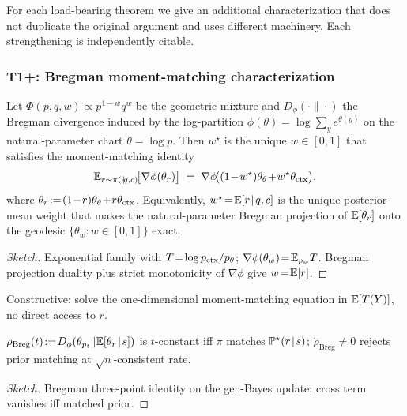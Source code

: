 For each load-bearing theorem we give an additional characterization
that does not duplicate the original argument and uses different
machinery.  Each strengthening is independently citable.

\subsubsection{T1+: Bregman moment-matching characterization}
\label{app:t1-bregman}

\begin{theorem}
\label{thm:t1-bregman}
Let $\Phi(p,q,w)\!\propto\!p^{1-w}q^{w}$ be the geometric mixture and
$D_\phi(\cdot\|\cdot)$ the Bregman divergence induced by the
log-partition $\phi(\theta)\!=\!\log\sum_y e^{\theta(y)}$ on the
natural-parameter chart $\theta\!=\!\log p$.  Then $w^\star$ is
the unique $w\!\in\![0,1]$ that satisfies the moment-matching
identity
\[
\E_{r\sim\pi(\cdot\!\mid\! q,c)}\!\bigl[\nabla\phi(\theta_r)\bigr]
\;=\;\nabla\phi\!\bigl((1\!-\!w^\star)\theta_\theta\!+\!w^\star\theta_\ctx\bigr),
\]
where $\theta_r\!:=\!(1\!-\!r)\theta_\theta\!+\!r\theta_{\mathrm{ctx}}$.
Equivalently, $w^\star\!=\!\mathbb{E}[r\!\mid\! q,c]$ is the unique
posterior-mean weight that makes the natural-parameter Bregman
projection of $\mathbb{E}[\theta_r]$ onto the geodesic
$\{\theta_w\!:\!w\!\in\![0,1]\}$ exact.
\end{theorem}

\begin{proof}[Sketch]
Exponential family with $T\!=\!\log p_{\mathrm{ctx}}/p_\theta$;
$\nabla\phi(\theta_w)\!=\!\mathbb{E}_{p_w}T$.  Bregman projection duality
plus strict monotonicity of $\nabla\phi$ give $w\!=\!\mathbb{E}[r]$.
\end{proof}

Constructive: solve the one-dimensional moment-matching equation
in $\mathbb{E}[T(Y)]$, no direct access to $r$.

\begin{corollary}
\label{cor:bregman-conserved}
$\rho_{\mathrm{Breg}}(t)\!:=\!D_\phi(\theta_{p_t}\|\mathbb{E}[\theta_r\!\mid\!s])$
is $t$-constant iff $\pi$ matches $\mathbb{P}^\star(r\!\mid\!s)$;
$\dot\rho_{\mathrm{Breg}}\!\ne\!0$ rejects prior matching at
$\sqrt n$-consistent rate.
\end{corollary}

\begin{proof}[Sketch]
Bregman three-point identity on the gen-Bayes update; cross term
vanishes iff matched prior.
\end{proof}


